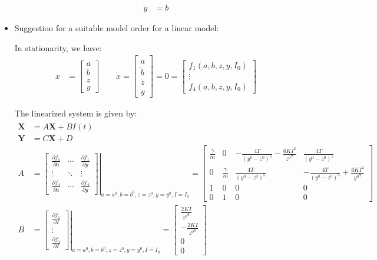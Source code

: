 \documentclass[10pt,a4paper]{article}
\begin{document}
\begin{itemize}
\begin{align}
		\dot{y} &= b
	\end{align}
	\item Suggestion for a suitable model order for a linear model:
	\par In stationarity, we have:
	\begin{align}
		x &= \begin{bmatrix} a \\ b \\ z \\ y \end{bmatrix} \qquad \dot{x} = \begin{bmatrix} \dot{a} \\ \dot{b} \\ \dot{z} \\ \dot{y} \end{bmatrix} = 0 = \begin{bmatrix} f_{1}(a, b, z, y, I_{0}) \\ \vdots \\ f_{4}(a, b, z, y, I_{0}) \end{bmatrix}
	\end{align}
	\par The linearized system is given by:
	\begin{align}
		\dot{\mathbf{X}} &= A \mathbf{X} + B I(t) \\
		\mathbf{Y} &= C \mathbf{X} + D\\
		A &= \left. \begin{bmatrix} \frac{\partial f_{1}}{\partial a} & \cdots & \frac{\partial f_{1}}{\partial y} \\ \vdots & \ddots & \vdots \\ \frac{\partial f_{4}}{\partial a} & \cdots & \frac{\partial f_{4}}{\partial y} \end{bmatrix} \right|_{a = a^{0}, b = b^{0}, z = z^{0}, y = y^{0}, I = I_{0}} = \begin{bmatrix} \frac{\gamma}{m} & 0 & - \frac{4 T}{(y^{0} - z^{0})^{5}} - \frac{6 K I^{2}}{{z^{0}}^{7}} & \frac{4 T}{(y^{0} - z^{0})^{5}} \\ 0 & \frac{\gamma}{m} & \frac{4 T}{(y^{0} - z^{0})^{5}} & - \frac{4 T}{(y^{0} - z^{0})^{5}} + \frac{6 K I^{2}}{{y^{0}}^{7}} \\ 1 & 0 & 0 & 0 \\ 0 & 1 & 0 & 0 \end{bmatrix} \\ 
		B &= \left. \begin{bmatrix} \frac{\partial f_{1}}{\partial I} \\ \vdots \\ \frac{\partial f_{4}}{\partial I} \end{bmatrix} \right|_{a = a^{0}, b = b^{0}, z = z^{0}, y = y^{0}, I = I_{0}} = \begin{bmatrix} \frac{2 K I}{{z^{0}}^{6}} \\ - \frac{2 K I}{{z^{0}}^{6}} \\ 0 \\ 0 \end{bmatrix} \\

\end{align}
\end{itemize}
\end{document}
